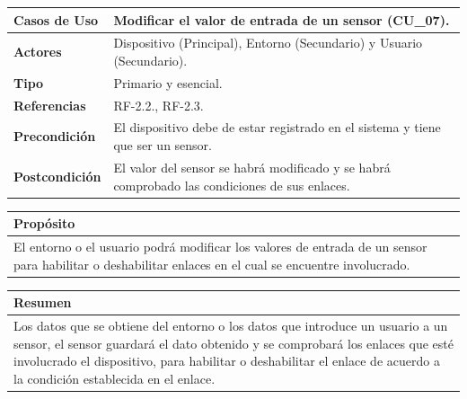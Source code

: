 \begin{itemize}
    \begin{table}[h!]
        \centering
        \begin{tabular}{|l|p{}|}
            \hline
            \textbf{Casos de Uso}   &   Modificar el valor de entrada de un sensor (CU\_07). \\
            \hline 
            \textbf{Actores}        &   Dispositivo (Principal), Entorno (Secundario) y Usuario (Secundario). \\ 
            \hline 
            \textbf{Tipo}           &   Primario y esencial. \\ 
            \hline
            \textbf{Referencias}    &   RF-2.2., RF-2.3. \\ 
            \hline
            \textbf{Precondición}   &   El dispositivo debe de estar registrado en el sistema y tiene que ser un sensor. \\ 
            \hline
            \textbf{Postcondición}  &   El valor del sensor se habrá modificado y se habrá comprobado las condiciones de sus enlaces. \\ 
            \hline
        \end{tabular}
        
        \vspace{5mm}
        
        \begin{tabular}{|p{\textwidth}|}
            \hline
            \rowcolor{SeaGreen} \textbf{Propósito} \\
            \hline
            \multicolumn{1}{|p{12cm}|}{El entorno o el usuario podrá modificar los valores de entrada de un sensor para habilitar o 
            deshabilitar enlaces en el cual se encuentre involucrado.} \\ [0.5ex]
            \hline
        \end{tabular}
        
        \vspace{5mm}
        
        \begin{tabular}{|p{\textwidth}|}
            \hline
            \rowcolor{SeaGreen} \textbf{Resumen} \\
            \hline
            \multicolumn{1}{|p{12cm}|}{Los datos que se obtiene del entorno o los datos que introduce un usuario a un sensor, el sensor guardará el dato obtenido y 
            se comprobará los enlaces que esté involucrado el dispositivo, para habilitar o deshabilitar el enlace de acuerdo a la condición establecida en el enlace.} \\ [0.5ex]
            \hline
        \end{tabular}
        

\end{table}
\end{itemize}

